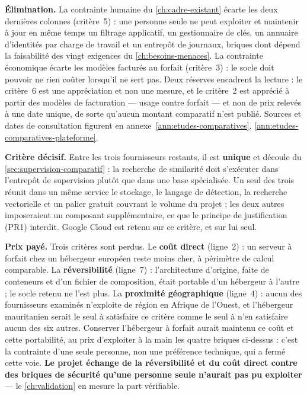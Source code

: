\textbf{Élimination.} La contrainte humaine du \cref{ch:cadre-existant} écarte les deux dernières
colonnes (critère~5) : une personne seule ne peut exploiter et maintenir à jour en même temps un
filtrage applicatif, un gestionnaire de clés, un annuaire d'identités par charge de travail et un
entrepôt de journaux, briques dont dépend la faisabilité des vingt exigences du
\cref{ch:besoins-menaces}. La contrainte économique écarte les modèles facturés au forfait
(critère~3) : le socle doit pouvoir ne rien coûter lorsqu'il ne sert pas. Deux réserves encadrent
la lecture : le critère~6 est une appréciation et non une mesure, et le critère~2 est apprécié à
partir des modèles de facturation --- usage contre forfait --- et non de prix relevés à une date
unique, de sorte qu'aucun montant comparatif n'est publié. Sources et dates de consultation
figurent en annexe~\ref{ann:etudes-comparatives},
\cref{ann:etudes-comparatives-plateforme}.

\textbf{Critère décisif.} Entre les trois fournisseurs restants, il est \textbf{unique} et découle
du \cref{sec:supervision-comparatif} : la recherche de similarité doit s'exécuter dans
l'entrepôt de supervision plutôt que dans une base spécialisée. Un seul des trois réunit dans un
même service le stockage, le langage de détection, la recherche vectorielle et un palier gratuit
couvrant le volume du projet ; les deux autres imposeraient un composant supplémentaire, ce que le
principe de justification (PR1) interdit. Google Cloud est retenu sur ce critère, et sur lui seul.

\textbf{Prix payé.} Trois critères sont perdus. Le \textbf{coût direct} (ligne~2) : un serveur à
forfait chez un hébergeur européen reste moins cher, à périmètre de calcul comparable. La
\textbf{réversibilité} (ligne~7) : l'architecture d'origine, faite de conteneurs et d'un fichier
de composition, était portable d'un hébergeur à l'autre ; le socle retenu ne l'est plus. La
\textbf{proximité géographique} (ligne~4) : aucun des fournisseurs examinés n'exploite de région
en Afrique de l'Ouest, et l'hébergeur mauritanien serait le seul à satisfaire ce critère comme le
seul à n'en satisfaire aucun des six autres. Conserver l'hébergeur à forfait aurait maintenu ce
coût et cette portabilité, au prix d'exploiter à la main les quatre briques ci-dessus : c'est la
contrainte d'une seule personne, non une préférence technique, qui a fermé cette voie. \textbf{Le
projet échange de la réversibilité et du coût direct contre des briques de sécurité qu'une
personne seule n'aurait pas pu exploiter} --- le \cref{ch:validation} en mesure la part
vérifiable.

